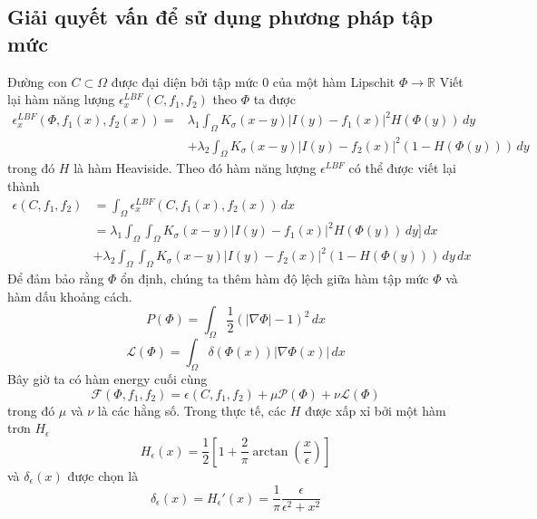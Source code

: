 \documentclass[12pt,oneside,a4]{report}
\begin{document}
\subsection{Giải quyết vấn để sử dụng phương pháp tập mức}
Đường con $C \subset \Omega$ được đại diện bởi tập mức 0 của một hàm Lipschit $\Phi \rightarrow \mathbb{R}$
Viết lại hàm năng lượng $\epsilon_x^{LBF}(C,f_1, f_2)$ theo $\Phi$ ta được
\begin{equation}
\begin{split}
\epsilon_x^{LBF}(\Phi, f_1(x), f_2(x))
=&\lambda_1 \int_{\Omega} K_{\sigma}(x-y)|I(y)-f_1(x)|^2H(\Phi(y))\,dy\\ &+ \lambda_2 \int_{\Omega} K_{\sigma}(x-y)|I(y)-f_2(x)|^2(1-H(\Phi(y)))\,dy 
\end{split}
\end{equation}
trong đó $H$ là hàm Heaviside. Theo đó hàm năng lượng $\epsilon^{LBF}$ có thể được viết lại thành
\begin{equation}
\begin{split}
\epsilon(C, f_1, f_2)&=\int_{\Omega} \epsilon_x^{LBF}(C, f_1(x), f_2(x))\,dx\\
&=\lambda_1 \int_{\Omega}\int_{\Omega} K_{\sigma}(x-y)|I(y)-f_1(x)|^2H(\Phi(y))\,dy]\,dx \\
&+ \lambda_2 \int_{\Omega}\int_{\Omega} K_{\sigma}(x-y)|I(y)-f_2(x)|^2(1-H(\Phi(y)))\,dy \,dx
\end{split}
\end{equation}
Để đảm bảo rằng $\Phi$ ổn định, chúng ta thêm hàm độ lệch giữa hàm tập mức $\Phi$ và hàm dấu khoảng cách.
\begin{equation}
P(\Phi)= \int_{\Omega}\dfrac{1}{2}(|\nabla \Phi|-1)^2\,dx
\end{equation}
\begin{equation}
\mathcal{L}(\Phi)=\int_{\Omega}\delta(\Phi(x))|\nabla \Phi(x)|\,dx
\end{equation}
Bây giờ ta có hàm energy cuối cùng
\begin{equation}
\mathcal{F}(\Phi,f_1,f_2)=\epsilon(C, f_1, f_2)+\mu \mathcal{P}(\Phi)+\nu \mathcal{L}(\Phi)
\end{equation}
trong đó $\mu$ và $\nu$ là các hằng số. Trong thực tế, các $H$ được xấp xỉ bởi một hàm trơn $H_{\epsilon}$
\begin{equation}
H_{\epsilon}(x)=\dfrac{1}{2}[1+\dfrac{2}{\pi}\arctan(\dfrac{x}{\epsilon})]
\end{equation}
và $\delta_{\epsilon}(x)$ được chọn là
\begin{equation}
\delta_{\epsilon}(x)=H_{\epsilon}'(x)=\dfrac{1}{\pi}\dfrac{\epsilon}{\epsilon^2+x^2}
\end{equation}
\end{document}
